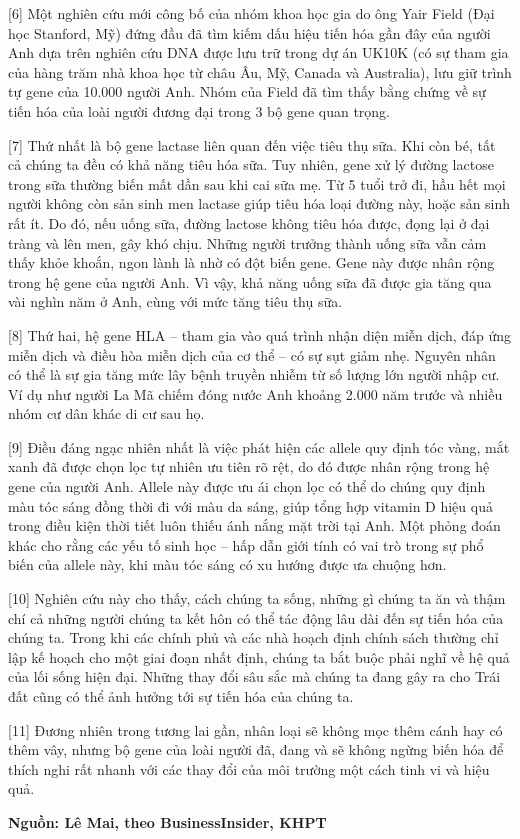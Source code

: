 \documentclass[12pt,a4paper,twoside]{article}
\newenvironment{readingpassage}[1][]{%
    \begin{tcolorbox}[enhanced, colback=grayLight, colframe=secondaryBlue,
        coltitle=textDark, fonttitle=\bfseries, title={#1},
        rounded corners, arc=3mm, boxrule=1pt,
        left=15pt, right=15pt, top=10pt, bottom=10pt,
        breakable, before skip=10pt, after skip=10pt, drop fuzzy shadow]
    \setstretch{1.3}
}{\end{tcolorbox}}
\begin{document}
\begin{readingpassage}[]
[6] Một nghiên cứu mới công bố của nhóm khoa học gia do ông Yair Field (Đại học Stanford, Mỹ) đứng đầu đã tìm kiếm dấu hiệu tiến hóa gần đây của người Anh dựa trên nghiên cứu DNA được lưu trữ trong dự án UK10K (có sự tham gia của hàng trăm nhà khoa học từ châu Âu, Mỹ, Canada và Australia), lưu giữ trình tự gene của 10.000 người Anh. Nhóm của Field đã tìm thấy bằng chứng về sự tiến hóa của loài người đương đại trong 3 bộ gene quan trọng.

[7] Thứ nhất là bộ gene lactase liên quan đến việc tiêu thụ sữa. Khi còn bé, tất cả chúng ta đều có khả năng tiêu hóa sữa. Tuy nhiên, gene xử lý đường lactose trong sữa thường biến mất dần sau khi cai sữa mẹ. Từ 5 tuổi trở đi, hầu hết mọi người không còn sản sinh men lactase giúp tiêu hóa loại đường này, hoặc sản sinh rất ít. Do đó, nếu uống sữa, đường lactose không tiêu hóa được, đọng lại ở đại tràng và lên men, gây khó chịu. Những người trưởng thành uống sữa vẫn cảm thấy khỏe khoắn, ngon lành là nhờ có đột biến gene. Gene này được nhân rộng trong hệ gene của người Anh. Vì vậy, khả năng uống sữa đã được gia tăng qua vài nghìn năm ở Anh, cùng với mức tăng tiêu thụ sữa.

[8] Thứ hai, hệ gene HLA -- tham gia vào quá trình nhận diện miễn dịch, đáp ứng miễn dịch và điều hòa miễn dịch của cơ thể -- có sự sụt giảm nhẹ. Nguyên nhân có thể là sự gia tăng mức lây bệnh truyền nhiễm từ số lượng lớn người nhập cư. Ví dụ như người La Mã chiếm đóng nước Anh khoảng 2.000 năm trước và nhiều nhóm cư dân khác di cư sau họ.

[9] Điều đáng ngạc nhiên nhất là việc phát hiện các allele quy định tóc vàng, mắt xanh đã được chọn lọc tự nhiên ưu tiên rõ rệt, do đó được nhân rộng trong hệ gene của người Anh. Allele này được ưu ái chọn lọc có thể do chúng quy định màu tóc sáng đồng thời đi với màu da sáng, giúp tổng hợp vitamin D hiệu quả trong điều kiện thời tiết luôn thiếu ánh nắng mặt trời tại Anh. Một phỏng đoán khác cho rằng các yếu tố sinh học -- hấp dẫn giới tính có vai trò trong sự phổ biến của allele này, khi màu tóc sáng có xu hướng được ưa chuộng hơn.

[10] Nghiên cứu này cho thấy, cách chúng ta sống, những gì chúng ta ăn và thậm chí cả những người chúng ta kết hôn có thể tác động lâu dài đến sự tiến hóa của chúng ta. Trong khi các chính phủ và các nhà hoạch định chính sách thường chỉ lập kế hoạch cho một giai đoạn nhất định, chúng ta bắt buộc phải nghĩ về hệ quả của lối sống hiện đại. Những thay đổi sâu sắc mà chúng ta đang gây ra cho Trái đất cũng có thể ảnh hưởng tới sự tiến hóa của chúng ta.

[11] Đương nhiên trong tương lai gần, nhân loại sẽ không mọc thêm cánh hay có thêm vây, nhưng bộ gene của loài người đã, đang và sẽ không ngừng biến hóa để thích nghi rất nhanh với các thay đổi của môi trường một cách tinh vi và hiệu quả.

\hfill \textbf{Nguồn: Lê Mai, theo BusinessInsider, KHPT}
\end{readingpassage}
\end{document}
